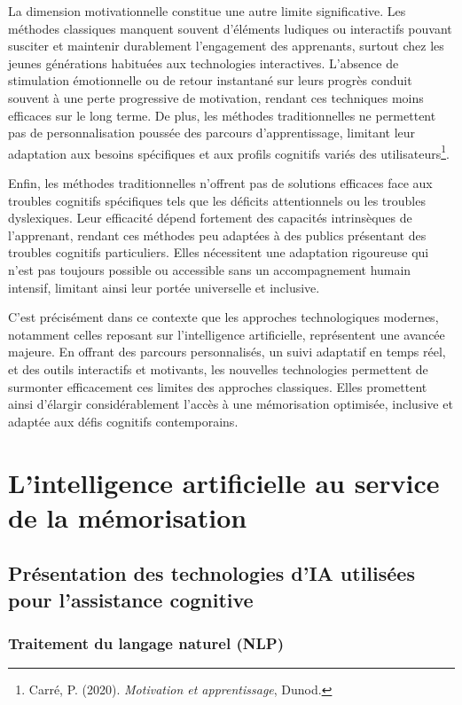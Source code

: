 \documentclass[11pt,a4paper]{report}
\begin{document}
La dimension motivationnelle constitue une autre limite significative. Les méthodes classiques manquent souvent d'éléments ludiques ou interactifs pouvant susciter et maintenir durablement l’engagement des apprenants, surtout chez les jeunes générations habituées aux technologies interactives. L’absence de stimulation émotionnelle ou de retour instantané sur leurs progrès conduit souvent à une perte progressive de motivation, rendant ces techniques moins efficaces sur le long terme. De plus, les méthodes traditionnelles ne permettent pas de personnalisation poussée des parcours d’apprentissage, limitant leur adaptation aux besoins spécifiques et aux profils cognitifs variés des utilisateurs\footnote{Carré, P. (2020). \textit{Motivation et apprentissage}, Dunod.}.

Enfin, les méthodes traditionnelles n’offrent pas de solutions efficaces face aux troubles cognitifs spécifiques tels que les déficits attentionnels ou les troubles dyslexiques. Leur efficacité dépend fortement des capacités intrinsèques de l'apprenant, rendant ces méthodes peu adaptées à des publics présentant des troubles cognitifs particuliers. Elles nécessitent une adaptation rigoureuse qui n’est pas toujours possible ou accessible sans un accompagnement humain intensif, limitant ainsi leur portée universelle et inclusive.

C’est précisément dans ce contexte que les approches technologiques modernes, notamment celles reposant sur l’intelligence artificielle, représentent une avancée majeure. En offrant des parcours personnalisés, un suivi adaptatif en temps réel, et des outils interactifs et motivants, les nouvelles technologies permettent de surmonter efficacement ces limites des approches classiques. Elles promettent ainsi d’élargir considérablement l’accès à une mémorisation optimisée, inclusive et adaptée aux défis cognitifs contemporains.

\chapter{L’intelligence artificielle au service de la mémorisation}

\section{Présentation des technologies d’IA utilisées pour l’assistance cognitive}

\subsection{Traitement du langage naturel (NLP)}
\end{document}
